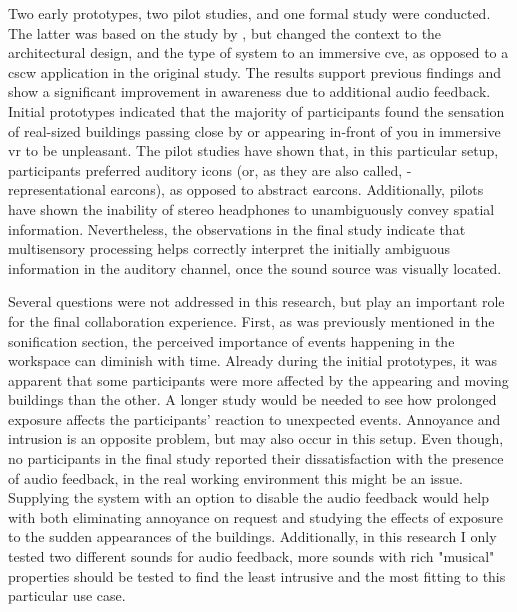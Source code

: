 Two early prototypes, two pilot studies, and one formal study were conducted. The latter was based on the study by \cite{gutwin_chalk_2011}, but changed the context to the architectural design, and the type of system to an immersive \gls{cve}, as opposed to a \gls{cscw} application in the original study. 
The results support previous findings and show a significant improvement in awareness due to additional audio feedback.
Initial prototypes indicated that the majority of participants found the sensation of real-sized buildings passing close by or appearing in-front of you in immersive \gls{vr} to be unpleasant. The pilot studies have shown that, in this particular setup, participants preferred auditory icons (or, as they are also called, - representational earcons), as opposed to abstract earcons. Additionally, pilots have shown the inability of stereo headphones to unambiguously convey spatial information. Nevertheless, the observations in the final study indicate that multisensory processing helps correctly interpret the initially ambiguous information in the auditory channel, once the sound source was visually located.

Several questions were not addressed in this research, but play an important role for the final collaboration experience. First, as was previously mentioned in the sonification section, the perceived importance of events happening in the workspace can diminish with time. Already during the initial prototypes, it was apparent that some participants were more affected by the appearing and moving buildings than the other. A longer study would be needed to see how prolonged exposure affects the participants' reaction to unexpected events. 
Annoyance and intrusion is an opposite problem, but may also occur in this setup. Even though, no participants in the final study reported their dissatisfaction with the presence of audio feedback, in the real working environment this might be an issue. Supplying the system with an option to disable the audio feedback would help with both eliminating annoyance on request and studying the effects of exposure to the sudden appearances of the buildings. Additionally, in this research I only tested two different sounds for audio feedback, more sounds with rich "musical" properties should be tested to find the least intrusive and the most fitting to this particular use case.

